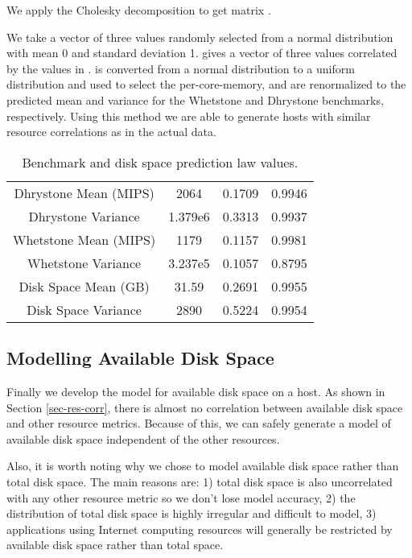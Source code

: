 \documentclass[conference]{IEEEtran}
\begin{document}
We apply the Cholesky decomposition to get matrix .


We take a vector  of three values randomly selected from a normal distribution with mean 0 and standard deviation 1.   gives a vector of three values correlated by the values in .   is converted from a normal distribution to a uniform distribution and used to select the per-core-memory,  and  are renormalized to the predicted mean and variance for the Whetstone and Dhrystone benchmarks, respectively.  Using this method we are able to generate hosts with similar resource correlations as in the actual data.

\begin{table}
\caption{Benchmark and disk space prediction law values.}
\centering
\begin{tabular}{|c|c|c|c|}
\hline
&  &  &  \\
\hline
Dhrystone Mean (MIPS) & 2064 & 0.1709 & 0.9946 \\
\hline
Dhrystone Variance & 1.379e6 & 0.3313 & 0.9937 \\
\hline
Whetstone Mean (MIPS) & 1179 & 0.1157 & 0.9981 \\
\hline
Whetstone Variance & 3.237e5 & 0.1057 & 0.8795 \\
\hline
Disk Space Mean (GB) & 31.59 & 0.2691 & 0.9955 \\
\hline
Disk Space Variance & 2890 & 0.5224 & 0.9954 \\
\hline
\end{tabular}
\label{benchmark-ratio-val-table}
\end{table}

\subsection{Modelling Available Disk Space}
\label{sec-model-disk}

Finally we develop the model for available disk space on a host.  As shown in Section \ref{sec-res-corr}, there is almost no correlation between available disk space and other resource metrics.  Because of this, we can safely generate a model of available disk space independent of the other resources.

Also, it is worth noting why we chose to model available disk space rather than total disk space.  The main reasons are: 1) total disk space is also uncorrelated with any other resource metric so we don't lose model accuracy, 2) the distribution of total disk space is highly irregular and difficult to model, 3) applications using Internet computing resources will generally be restricted by available disk space rather than total space.
\end{document}
